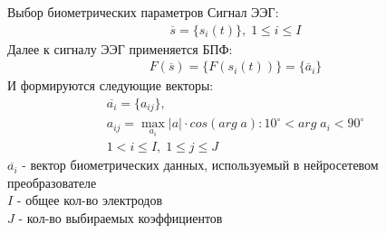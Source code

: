 \begin{frame}{Выбор биометрических параметров}
	Сигнал ЭЭГ:
	\begin{gather*}
		\overline{s} = \{ s_i(t) \},\; 1 \leq i \leq I
	\end{gather*}
	Далее к сигналу ЭЭГ применяется БПФ:
	\begin{gather*}
		F(\overline{s}) = \{ F(s_i(t)) \} = \{ \overline{a}_i \}
	\end{gather*}
	И формируются следующие векторы:
	\begin{gather*}
		\overline{a_i} = \{ a_{ij} \}, \\
		a_{ij} = \max_{a_i}|a| \cdot cos(arg \; a) : 10^{\circ} < arg \; a_i < 90^{\circ} \\ 1 < i \leq I,\; 1 \leq j \leq J
	\end{gather*}
	$\overline{a_i}$ - вектор биометрических данных, используемый в нейросетевом преобразователе \\
	$I$ - общее кол-во электродов \\
	$J$ - кол-во выбираемых коэффициентов
\end{frame}
